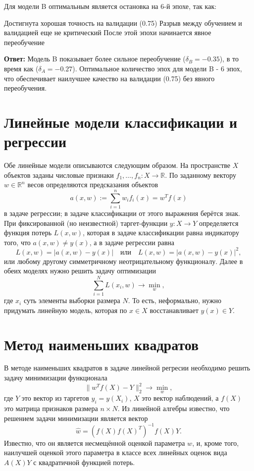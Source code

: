 Для модели B оптимальным является остановка на 6-й эпохе, так как:

Достигнута хорошая точность на валидации (0.75)
Разрыв между обучением и валидацией еще не критический
После этой эпохи начинается явное переобучение

\textbf{Ответ:}
Модель B показывает более сильное переобучение ($\delta_B = -0.35$), в то время как ($\delta_A = -0.27$). Оптимальное количество эпох для модели B - 6 эпох, что обеспечивает наилучшее качество на валидации (0.75) без явного переобучения.

\section{Линейные модели классификации и регрессии}

Обе линейные модели описываются следующим образом.
На пространстве $X$ объектов заданы числовые признаки \( f_1, \ldots, f_n\colon X\to\mathbb{R}\). По заданному вектору \(w\in\mathbb{R}^n\) весов определяются предсказания объектов
\[
    a(x,w) := \sum_{i=1}^n w_if_i(x) = w^Tf(x)
\]
в задаче регрессии; в задаче классификации от этого выражения берётся знак. При фиксированной (но неизвестной) таргет-функции \( y\colon X\to Y\) определяется функция потерь \( L(x, w)\), которая в задаче классификации равна индикатору того, что \(a(x,w) \neq y(x)\), а в задаче регрессии равна
\[
    L(x,w) = \lvert{a(x,w)-y(x)}\rvert
    \quad\text{или}\quad
    L(x,w) = \lvert{a(x,w)-y(x)}\rvert^2,
\]
или любому другому симметричному неотрицательному функционалу.
Далее в обеих моделях нужно решить задачу оптимизации
\[
    \sum_{i=1}^N L(x_i, w) \to \min_{w},
\]
где $x_i$ суть элементы выборки размера $N$. То есть, неформально, нужно придумать линейную модель, которая по $x \in X$ восстанавливает $y(x) \in Y$.

\section{Метод наименьших квадратов}

В методе наименьших квадратов в задаче линейной регресии необходимо решить задачу минимизации функционала
\[
    \lVert{w^Tf(X) - Y}\rVert_2^2 \to \min_w,
\]
где $Y$ это вектор из таргетов $y_i = y(X_i)$, $X$ это вектор наблюдений, а $f(X)$ это матрица признаков размера $n \times N$.
Из линейной алгебры известно, что решением задачи минимизации является вектор
\[
    \hat{w} = (f(X)f(X)^T)^{-1}f(X)Y.
\]
Известно, что он является несмещённой оценкой параметра $w$, и, кроме того, наилучшей оценкой этого параметра в классе всех линейных оценок вида $A(X)Y$ с квадратичной функцией потерь.

